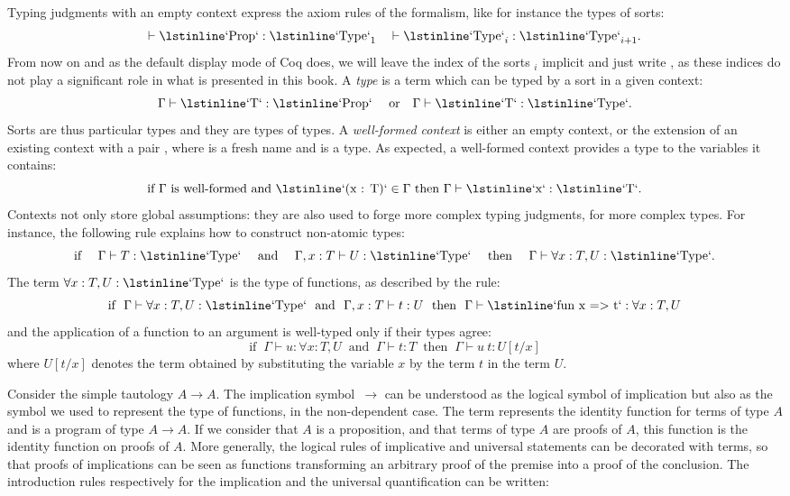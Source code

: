 Typing judgments with an empty context express the
axiom rules of the formalism, like for instance the types of sorts:
$$\vdash \C{Prop} : \C{Type}_1 \quad \vdash \C{Type}_i : \C{Type}_{i+1}.$$
From now on and as the default display mode of Coq does, we will leave
the index of the sorts $_i$ implicit and just write ,
as these indices do not play a significant role in what is presented
in this book. A \emph{type} is a term which can be typed by a sort in
a given context:
$$\Gamma \vdash \C{T} : \C{Prop} \quad \textrm{ or}
\quad \Gamma \vdash \C{T} : \C{Type}.$$
Sorts are thus particular types and they are types of types.
A \emph{well-formed context} is either an empty context, or the
extension of an existing context with a pair , where 
is a fresh name and  is a type. As expected, a well-formed
context provides a type to the variables it contains:
$$\textrm{if } \Gamma \textrm{ is well-formed  and }
\C{(x : T)} \in \Gamma \textrm{ then }
\Gamma \vdash \C{x} : \C{T}.$$
Contexts not only store global assumptions: they are also used to
forge more complex typing judgments, for more complex types. For
instance, the following rule explains how to construct non-atomic
types:
$$\textrm{if }\quad \Gamma \vdash T : \C{Type} \quad\textrm{ and }\quad
\Gamma, x : T \vdash U : \C{Type} \quad\textrm{ then }\quad
\Gamma \vdash \forall x : T, U : \C{Type}.$$
The term $ \forall x : T, U : \C{Type}$ is the type of functions, as
described by the rule:
$$\textrm{if } \ \Gamma \vdash \forall x : T, U : \C{Type}
\ \textrm{ and }\
\Gamma, x : T \vdash t : U
\ \textrm{ then }\
\Gamma \vdash \C{fun x => t} : \forall x : T, U
$$
and the application of a function to an argument is well-typed only if
their types agree:
$$\textrm{if } \ \Gamma \vdash u : \forall x : T, U
\ \textrm{ and }\
\Gamma \vdash t : T
\ \textrm{ then }\
\Gamma \vdash u\ t : U[t/x]
$$
where $U[t/x]$ denotes the term obtained by substituting
the variable $x$ by the term $t$ in the term $U$.

Consider the simple tautology $A \rightarrow A$.
The implication symbol~$\to$ can be understood as the logical symbol
of implication but also as the symbol we used
to represent the type of functions, in the non-dependent case. The
term \C{(fun x : A => x)} represents the identity function for terms
of type $A$ and is a program of type $A \rightarrow A$. If we consider
that $A$ is a proposition, and that terms of type $A$ are proofs of
$A$, this function is the identity function on proofs of $A$.
More generally, the logical rules of implicative and universal
statements can be decorated with terms, so that proofs of implications
can be seen as functions transforming an arbitrary proof of the
premise into a proof of the conclusion. The introduction rules
respectively for the implication and the universal quantification can
be written:

